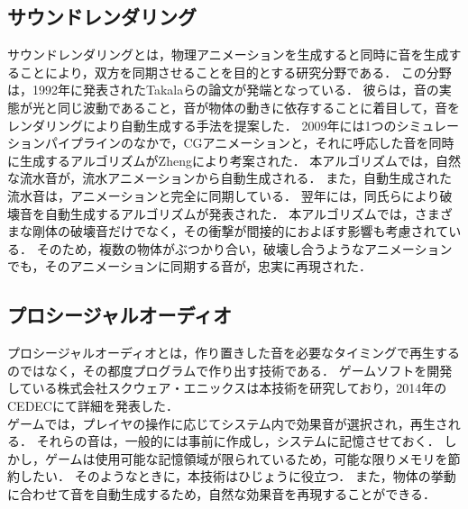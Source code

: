 \subsection{サウンドレンダリング}
サウンドレンダリングとは，物理アニメーションを生成すると同時に音を生成することにより，双方を同期させることを目的とする研究分野である．
この分野は，1992年に発表されたTakalaらの論文\cite{sound}が発端となっている．
彼らは，音の実態が光と同じ波動であること，音が物体の動きに依存することに着目して，音をレンダリングにより自動生成する手法を提案した．
2009年には1つのシミュレーションパイプラインのなかで，CGアニメーションと，それに呼応した音を同時に生成するアルゴリズム\cite{james1}がZhengにより考案された．
本アルゴリズムでは，自然な流水音が，流水アニメーションから自動生成される．
また，自動生成された流水音は，アニメーションと完全に同期している．
%
翌年には，同氏らにより破壊音を自動生成するアルゴリズム\cite{james2}が発表された．
本アルゴリズムでは，さまざまな剛体の破壊音だけでなく，その衝撃が間接的におよぼす影響も考慮されている．
そのため，複数の物体がぶつかり合い，破壊し合うようなアニメーションでも，そのアニメーションに同期する音が，忠実に再現された．
%
\subsection{プロシージャルオーディオ}
プロシージャルオーディオとは，作り置きした音を必要なタイミングで再生するのではなく，その都度プログラムで作り出す技術である．
ゲームソフトを開発している株式会社スクウェア・エニックスは本技術を研究しており，2014年のCEDECにて詳細\cite{SQUARE}を発表した．\\
\indent
ゲームでは，プレイヤの操作に応じてシステム内で効果音が選択され，再生される．
それらの音は，一般的には事前に作成し，システムに記憶させておく．
しかし，ゲームは使用可能な記憶領域が限られているため，可能な限りメモリを節約したい．
そのようなときに，本技術はひじょうに役立つ．
また，物体の挙動に合わせて音を自動生成するため，自然な効果音を再現することができる．

